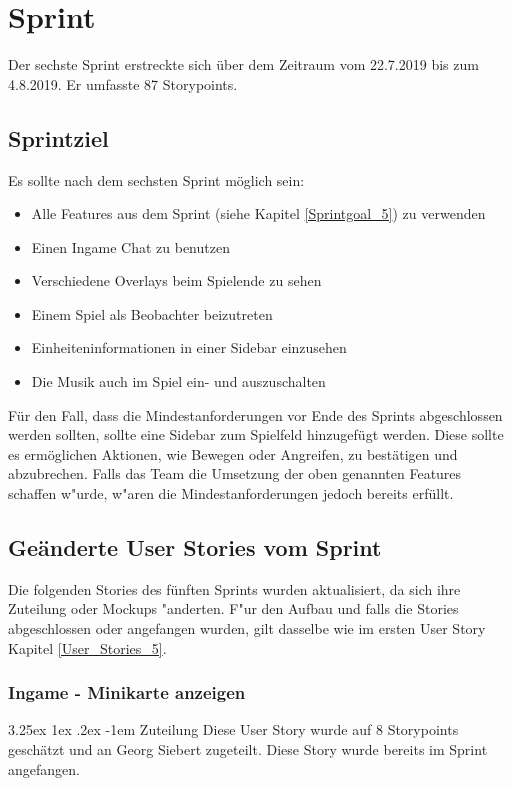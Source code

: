 \documentclass[12pt, titlepage]{scrartcl}
\makeatletter
\newcommand{\RN}[1]{%
	\textup{\uppercase\expandafter{\romannumeral#1}}%
}
\renewcommand\paragraph{\@startsection{paragraph}{5}{\z@}%
  {3.25ex \@plus1ex \@minus.2ex}%
  {-1em}%
  {\normalfont\normalsize\bfseries}}
\makeatother
\begin{document}
    \section{Sprint \RN{6}}
    	Der sechste Sprint erstreckte sich \"uber dem Zeitraum vom 22.7.2019 bis zum 4.8.2019. Er umfasste 87 Storypoints.
    	\subsection{Sprintziel}
    		Es sollte nach dem sechsten Sprint m\"oglich sein:
    		\begin{itemize}
    			\item Alle Features aus dem Sprint \RN{5} (siehe Kapitel \ref{Sprintgoal_5}) zu verwenden
    			\item Einen Ingame Chat zu benutzen
    			\item Verschiedene Overlays beim Spielende zu sehen
    			\item Einem Spiel als Beobachter beizutreten
    			\item Einheiteninformationen in einer Sidebar einzusehen
    			\item Die Musik auch im Spiel ein- und auszuschalten
    		\end{itemize}
    		F\"ur den Fall, dass die Mindestanforderungen vor Ende des Sprints abgeschlossen werden sollten, sollte eine Sidebar zum Spielfeld hinzugef\"ugt werden. Diese sollte es erm\"oglichen Aktionen, wie Bewegen oder Angreifen, zu best\"atigen und abzubrechen. Falls das Team die Umsetzung der oben genannten Features schaffen w"urde, w"aren die Mindestanforderungen jedoch bereits erf\"ullt.
    	\subsection{Ge\"anderte User Stories vom Sprint \RN{5}}
    		Die folgenden Stories des f\"unften Sprints wurden aktualisiert, da sich ihre Zuteilung oder Mockups "anderten. F"ur den Aufbau und falls die Stories abgeschlossen oder angefangen wurden, gilt dasselbe wie im ersten User Story Kapitel \ref{User_Stories_5}.
    		\subsubsection{Ingame - Minikarte anzeigen} \label{changed_user_story_minimap}
    			 \paragraph{Zuteilung}
    				Diese User Story wurde auf 8 Storypoints gesch\"atzt und an Georg Siebert zugeteilt. Diese Story wurde bereits im Sprint \RN{5} angefangen.
\end{document}
